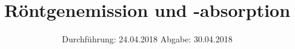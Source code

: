 

\subject{602}
\title{Röntgenemission und -absorption}
\date{%
  Durchführung: 24.04.2018
  \hspace{3em}
  Abgabe: 30.04.2018
}



\maketitle
\thispagestyle{empty}
\tableofcontents
\newpage







\printbibliography{}


